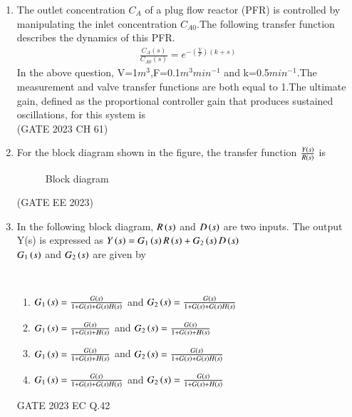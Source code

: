 \begin{enumerate}[label=\thechapter.\arabic*,ref=\thechapter.\theenumi]
\item The outlet concentration $C_A$ of a plug flow reactor (PFR) is controlled by manipulating the inlet concentration $C_{A0}$.The following transfer function describes the dynamics of this PFR.
\begin{align*}
    \frac{C_{A}(s)}{C_{A0}(s)}=e^{-(\frac{V}{F})(k+s)}
\end{align*}
In the above question, V=1$m^3$,F=0.1$m^3$$min^{-1}$ and k=0.5$min^{-1}$.The measurement and valve transfer functions are both equal to 1.The ultimate gain, defined as the proportional controller gain that produces sustained oscillations, for this system is\\ \hfill{(GATE 2023 CH 61)}\\
\solution
\item For the block diagram shown in the figure, the transfer function $\frac{Y\left(s\right)}{R\left(s\right)}$ is \\
\begin{figure}[H]
    {}
    \caption{Block diagram}
    \label{fig:gate_ee_Q12_blockdiagram}
\end{figure}
\hfill (GATE EE 2023)\\
\solution

\newpage

\item In the following block diagram, $R\left(s\right)$ and $D\left(s\right)$ are two inputs. The output Y(s) is expressed as $Y\left(s\right) = G_1\left(s\right)R\left(s\right) + G_2\left(s\right)D\left(s\right)$\\
$G_1\left(s\right)$ and $G_2\left(s\right)$ are given by\\
\begin{figure}[htbp!]
\centering

\end{figure}\\
\begin{enumerate}[label=\alph*)]
\item $G_1\left(s\right) = \frac{G\left(s\right)}{1+G\left(s\right)+G\left(s\right)H\left(s\right)}$ and $G_2\left(s\right) = \frac{G\left(s\right)}{1+ G\left(s\right)+G\left(s\right)H\left(s\right)}$\\
\item $G_1\left(s\right) = \frac{G\left(s\right)}{1+G\left(s\right)+H\left(s\right)}$ and $G_2\left(s\right) = \frac{G\left(s\right)}{1+ G\left(s\right)+H\left(s\right)}$\\
\item $G_1\left(s\right) = \frac{G\left(s\right)}{1+G\left(s\right)+H\left(s\right)}$ and $G_2\left(s\right) = \frac{G\left(s\right)}{1+ G\left(s\right)+G\left(s\right)H\left(s\right)}$\\
\item $G_1\left(s\right) = \frac{G\left(s\right)}{1+G\left(s\right)+G\left(s\right)H\left(s\right)}$ and $G_2\left(s\right) = \frac{G\left(s\right)}{1+ G\left(s\right)+H\left(s\right)}$\\
\end{enumerate}
\hfill{GATE 2023 EC Q.42}\\
\solution\\

\newpage


\end{enumerate}
